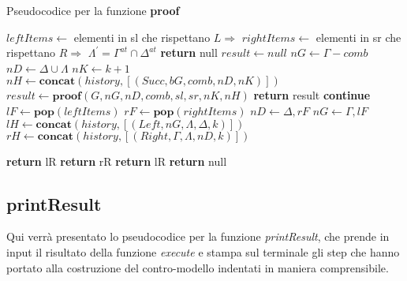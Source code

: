 \documentclass[\main/tesi.tex]{subfiles}
\begin{document}
\begin{algorithm}
    \caption{Pseudocodice per la funzione \textbf{proof}}\label{alg:proof}
    \begin{algorithmic}
        \State $leftItems \gets $ elementi in sl che rispettano $L\Rightarrow$
        \State $rightItems \gets $ elementi in sr che rispettano $R\Rightarrow$
        \State $\Lambda^{'} = \Gamma^{at} \cap \Delta^{at}$
        \State \textbf{return} null
        \Else
        \State $result \gets null$
        \State $nG \gets \Gamma - comb$
        \State $nD \gets \Delta \cup \Lambda$
        \State $nK \gets k + 1$
        \State $nH \gets \textbf{concat}(history, [(Succ, bG, comb, nD, nK)])$
        \State $result \gets \textbf{proof}(G, nG, nD, comb, sl, sr, nK, nH)$
        \State \textbf{return} result
        \Else
        \State \textbf{continue}
        \EndIf
        \EndFor
        \EndIf
        \Else
        \State $lF \gets \textbf{pop}(leftItems)$
        \State $rF \gets \textbf{pop}(rightItems)$
        \State $nD \gets \Delta, rF$
        \State $nG \gets \Gamma, lF$
        \State $lH \gets \textbf{concat}(history, [(Left, nG, \Lambda, \Delta, k)])$
        \State $rH \gets \textbf{concat}(history, [(Right, \Gamma, \Lambda, nD, k)])$

        \State \textbf{return} lR
        \State \textbf{return} rR
        \State \textbf{return} lR
        \Else
        \State \textbf{return} null
        \EndIf
        \EndIf
        \EndWhile
        \EndFunction
    \end{algorithmic}
\end{algorithm}

\newpage

\subsection{printResult}
Qui verrà presentato lo pseudocodice per la funzione \textit{printResult}, che prende in input il risultato della funzione \textit{execute} e stampa sul terminale gli step che hanno portato alla costruzione del contro-modello indentati in maniera comprensibile. \\
\end{document}
